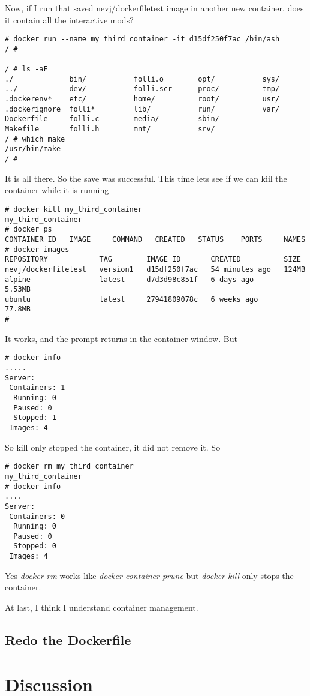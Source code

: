 \documentclass{article}  %
\begin{document}
Now, if I run that saved nevj/dockerfiletest image in another new container, does it contain all the interactive mods?
\begin{verbatim}
# docker run --name my_third_container -it d15df250f7ac /bin/ash
/ # 

/ # ls -aF
./             bin/           folli.o        opt/           sys/
../            dev/           folli.scr      proc/          tmp/
.dockerenv*    etc/           home/          root/          usr/
.dockerignore  folli*         lib/           run/           var/
Dockerfile     folli.c        media/         sbin/
Makefile       folli.h        mnt/           srv/
/ # which make
/usr/bin/make
/ # 
\end{verbatim}
 It is all there. So the save was successful.
This time lets see if we can kiil the container while it is running
\begin{verbatim}
# docker kill my_third_container
my_third_container
# docker ps
CONTAINER ID   IMAGE     COMMAND   CREATED   STATUS    PORTS     NAMES
# docker images
REPOSITORY            TAG        IMAGE ID       CREATED          SIZE
nevj/dockerfiletest   version1   d15df250f7ac   54 minutes ago   124MB
alpine                latest     d7d3d98c851f   6 days ago       5.53MB
ubuntu                latest     27941809078c   6 weeks ago      77.8MB
# 
\end{verbatim}
It works, and the prompt returns in the container window.
But
\begin{verbatim}
# docker info
.....
Server:
 Containers: 1
  Running: 0
  Paused: 0
  Stopped: 1
 Images: 4
\end{verbatim}
So kill only stopped the container, it did not remove it. So
\begin{verbatim}
# docker rm my_third_container
my_third_container
# docker info
....
Server:
 Containers: 0
  Running: 0
  Paused: 0
  Stopped: 0
 Images: 4
\end{verbatim}
 Yes {\em docker rm} works like {\em docker container prune} but {\em docker kill} only stops the container.

At last, I think I understand container management.

\subsection{Redo the Dockerfile}

\section{Discussion}
\end{document}

